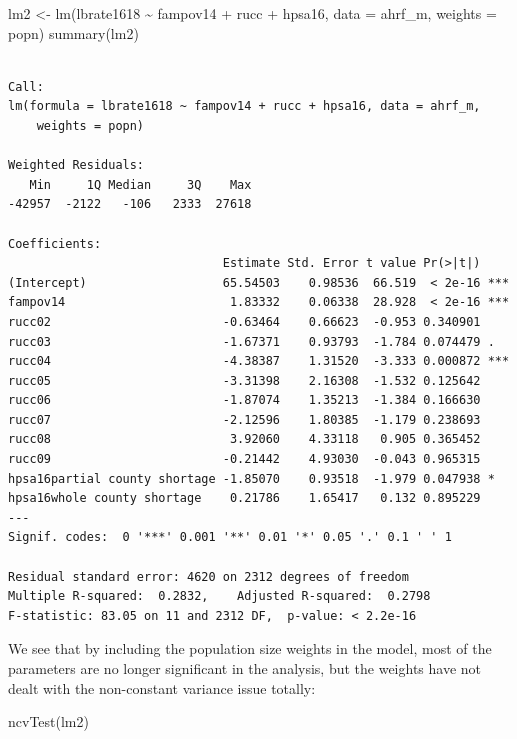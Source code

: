 \documentclass[
  letterpaper,
  DIV=11,
  numbers=noendperiod]{scrreprt}
\newenvironment{Shaded}{\begin{snugshade}}{\end{snugshade}}
\newcommand{\AttributeTok}[1]{\textcolor[rgb]{0.40,0.45,0.13}{#1}}
\newcommand{\FunctionTok}[1]{\textcolor[rgb]{0.28,0.35,0.67}{#1}}
\newcommand{\NormalTok}[1]{\textcolor[rgb]{0.00,0.23,0.31}{#1}}
\newcommand{\OtherTok}[1]{\textcolor[rgb]{0.00,0.23,0.31}{#1}}
\newcommand{\SpecialCharTok}[1]{\textcolor[rgb]{0.37,0.37,0.37}{#1}}
\begin{document}
\begin{Shaded}
\begin{Highlighting}[]
\NormalTok{lm2 }\OtherTok{\textless{}{-}} \FunctionTok{lm}\NormalTok{(lbrate1618 }\SpecialCharTok{\textasciitilde{}}\NormalTok{  fampov14 }\SpecialCharTok{+}\NormalTok{ rucc }\SpecialCharTok{+}\NormalTok{ hpsa16,}
          \AttributeTok{data =}\NormalTok{ ahrf\_m,}
          \AttributeTok{weights =}\NormalTok{ popn)}
\FunctionTok{summary}\NormalTok{(lm2)}
\end{Highlighting}
\end{Shaded}

\begin{verbatim}

Call:
lm(formula = lbrate1618 ~ fampov14 + rucc + hpsa16, data = ahrf_m, 
    weights = popn)

Weighted Residuals:
   Min     1Q Median     3Q    Max 
-42957  -2122   -106   2333  27618 

Coefficients:
                              Estimate Std. Error t value Pr(>|t|)    
(Intercept)                   65.54503    0.98536  66.519  < 2e-16 ***
fampov14                       1.83332    0.06338  28.928  < 2e-16 ***
rucc02                        -0.63464    0.66623  -0.953 0.340901    
rucc03                        -1.67371    0.93793  -1.784 0.074479 .  
rucc04                        -4.38387    1.31520  -3.333 0.000872 ***
rucc05                        -3.31398    2.16308  -1.532 0.125642    
rucc06                        -1.87074    1.35213  -1.384 0.166630    
rucc07                        -2.12596    1.80385  -1.179 0.238693    
rucc08                         3.92060    4.33118   0.905 0.365452    
rucc09                        -0.21442    4.93030  -0.043 0.965315    
hpsa16partial county shortage -1.85070    0.93518  -1.979 0.047938 *  
hpsa16whole county shortage    0.21786    1.65417   0.132 0.895229    
---
Signif. codes:  0 '***' 0.001 '**' 0.01 '*' 0.05 '.' 0.1 ' ' 1

Residual standard error: 4620 on 2312 degrees of freedom
Multiple R-squared:  0.2832,    Adjusted R-squared:  0.2798 
F-statistic: 83.05 on 11 and 2312 DF,  p-value: < 2.2e-16
\end{verbatim}

We see that by including the population size weights in the model, most
of the parameters are no longer significant in the analysis, but the
weights have not dealt with the non-constant variance issue totally:

\begin{Shaded}
\begin{Highlighting}[]
\FunctionTok{ncvTest}\NormalTok{(lm2)}
\end{Highlighting}
\end{Shaded}
\end{document}
